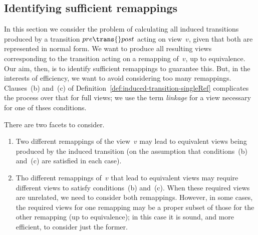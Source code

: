\subsection{Identifying sufficient remappings}


In this section we consider the problem of calculating all induced transitions
produced by a transition $pre \trans{} post$ acting on view~$v$, given that
both are represented in normal form.  We want to produce all resulting views
corresponding to the transition acting on a remapping of~$v$, up to
equivalence.  Our aim, then, is to identify sufficient remappings to guarantee
this.  But, in the interests of efficiency, we want to avoid considering too
many remappings.  Clauses~(b) and~(c) of
Definition~\ref{def:induced-transition-singleRef} complicates the process over
that for full views; we use the term \emph{linkage} for a view necessary for
one of thses conditions.


There are two facets to consider.
%
\begin{enumerate}
\item Two different remappings of the view~$v$ may lead to equivalent views
  being produced by the induced transition (on the assumption that
  conditions~(b) and~(c) are satisfied in each case).

\item Tho different remappings of~$v$ that lead to equivalent views may
  require different views to satisfy conditions~(b) and~(c).  When these
  required views are unrelated, we need to consider both remappings.  However,
  in some cases, the required views for one remapping may be a proper subset
  of those for the other remapping (up to equivalence); in this case it is
  sound, and more efficient, to consider just the former.  
\end{enumerate}

